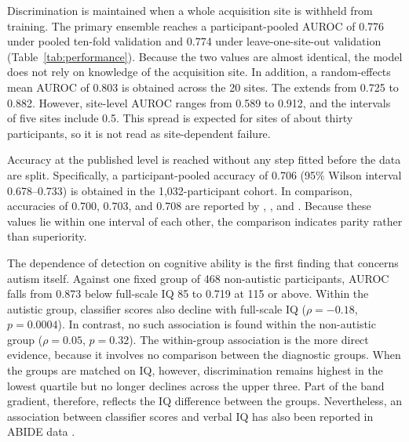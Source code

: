 Discrimination is maintained when a whole acquisition site is withheld from training. The
primary ensemble reaches a participant-pooled AUROC of 0.776 under pooled ten-fold validation
and 0.774 under leave-one-site-out validation (Table~\ref{tab:performance}). Because the
two values are almost identical, the model does not rely on knowledge of the acquisition
site. In addition, a random-effects mean AUROC of 0.803 is obtained across the 20 sites. The
 extends from 0.725 to 0.882.  However, site-level AUROC ranges from 0.589 to 0.912, and the intervals of five sites
include 0.5. This spread is expected for sites of about thirty participants, so it is not
read as site-dependent failure.

Accuracy at the published level is reached without any step fitted before the data are
split. Specifically, a participant-pooled accuracy of 0.706 (95\% Wilson interval
0.678--0.733) is obtained in the 1,032-participant cohort. In comparison, accuracies of
0.700, 0.703, and 0.708 are reported by \citet{Heinsfeldetal2018}, \citet{Eslamietal2019},
and \citet{AlmuqhimSaeed2021}. Because these values lie within one interval of each other,
the comparison indicates parity rather than superiority.

The dependence of detection on cognitive ability is the first finding that concerns autism
itself. Against one fixed group of 468 non-autistic participants, AUROC falls from 0.873
below full-scale IQ 85 to 0.719 at 115 or above. Within the autistic group, classifier scores
also decline with full-scale IQ ($\rho=-0.18$, $p=0.0004$). In contrast, no such association
is found within the non-autistic group ($\rho=0.05$, $p=0.32$). The within-group association
is the more direct evidence, because it involves no comparison between the diagnostic
groups. When the groups are matched on IQ, however, discrimination remains highest in the
lowest quartile but no longer declines across the upper three. Part of the band gradient,
therefore, reflects the IQ difference between the groups. Nevertheless, an association
between classifier scores and verbal IQ has also been reported in ABIDE data
\citep{Nielsenetal2013}. 

